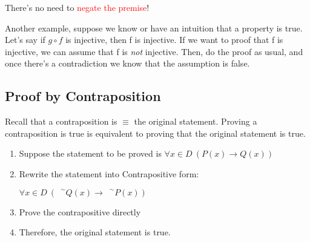 \documentclass{article}
\newcommand{\negation}{${\phantom{0}}^\sim$}
\begin{document}
There's no need to \textcolor{red}{negate the premise}!

\vspace{10pt}

Another example, suppose we know or have an intuition that a property is true. Let's say if $g\circ f$ is injective, then f is injective. If we want to proof that f is injective, we can assume that f is \textit{not} injective. Then, do the proof as usual, and once there's a contradiction we know that the assumption is false.

\subsection{Proof by Contraposition}
Recall that a contraposition is $\equiv$ the original statement. Proving a contraposition is true is equivalent to proving that the original statement is true.

\begin{enumerate}
    \item Suppose the statement to be proved is $\forall x \in D\ (P(x)\rightarrow Q(x))$
    \item Rewrite the statement into Contrapositive form:
    \begin{center}
        $\forall x \in D\ (\text{\negation}Q(x)\rightarrow \text{\negation}P(x))$
    \end{center}
    \item Prove the contrapositive directly
    \item Therefore, the original statement is true.
\end{enumerate}
\end{document}
